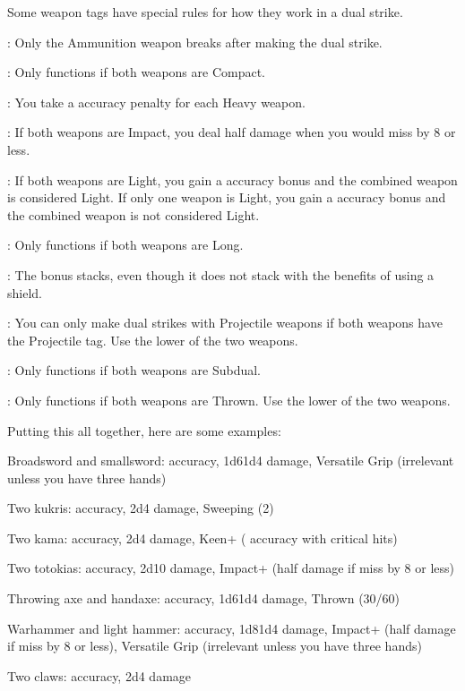     Some weapon tags have special rules for how they work in a dual strike.
    \begin{raggeditemize}
      \item {}: Only the Ammunition weapon breaks after making the dual strike.
      \item {}: Only functions if both weapons are Compact.
      \item {}: You take a  accuracy penalty for each Heavy weapon.
      \item {}: If both weapons are Impact, you deal half damage when you would miss by 8 or less.
      \item {}: If both weapons are Light, you gain a  accuracy bonus and the combined weapon is considered Light.
        If only one weapon is Light, you gain a  accuracy bonus and the combined weapon is not considered Light.
      \item {}: Only functions if both weapons are Long.
      \item {}: The bonus stacks, even though it does not stack with the benefits of using a shield.
      \item {}: You can only make dual strikes with Projectile weapons if both weapons have the Projectile tag. Use the lower  of the two weapons.
      \item {}: Only functions if both weapons are Subdual.
      \item {}: Only functions if both weapons are Thrown. Use the lower  of the two weapons.
    \end{raggeditemize}

    Putting this all together, here are some examples:
    \begin{raggeditemize}
      \item Broadsword and smallsword:  accuracy, 1d6\plus1d4 damage, Versatile Grip (irrelevant unless you have three hands)
      \item Two kukris:  accuracy, 2d4 damage, Sweeping (2)
      \item Two kama:  accuracy, 2d4 damage, Keen+ ( accuracy with critical hits)
      \item Two totokias:  accuracy, 2d10 damage, Impact+ (half damage if miss by 8 or less)
      \item Throwing axe and handaxe:  accuracy, 1d6\plus1d4 damage, Thrown (30/60)
      \item Warhammer and light hammer:  accuracy, 1d8\plus1d4 damage, Impact+ (half damage if miss by 8 or less), Versatile Grip (irrelevant unless you have three hands)
      \item Two claws:  accuracy, 2d4 damage
    \end{raggeditemize}

